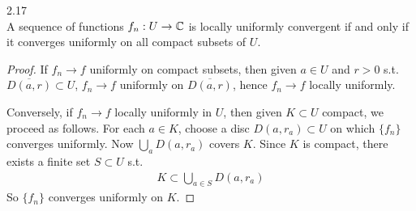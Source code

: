 \documentclass[a4paper]{article}
\begin{document}
\begin{prop} 2.17\\
A sequence of functions $f_n:U \to \mathbb{C}$ is locally uniformly convergent if and only if it converges uniformly on all compact subsets of $U$.
\begin{proof}
If $f_n \to f$ uniformly on compact subsets, then given $a \in U$ and $r>0$ s.t. $\overline{D(a,r)} \subset U$, $f_n \to f$ uniformly on $\overline{D(a,r)}$, hence $f_n \to f$ locally uniformly.

Conversely, if $f_n \to f$ locally uniformly in $U$, then given $K \subset U$ compact, we proceed as follows. For each $a \in K$, choose a disc $D(a,r_a) \subset U$ on which $\{f_n\}$ converges uniformly. Now $\bigcup_a D(a,r_a)$ covers $K$. Since $K$ is compact, there exists a finite set $S \subset U$ s.t.
\begin{equation*}
\begin{aligned}
K \subset \bigcup_{a \in S} D(a,r_a)
\end{aligned}
\end{equation*}
So $\{f_n\}$ converges uniformly on $K$.
\end{proof}
\end{prop}
\end{document}
